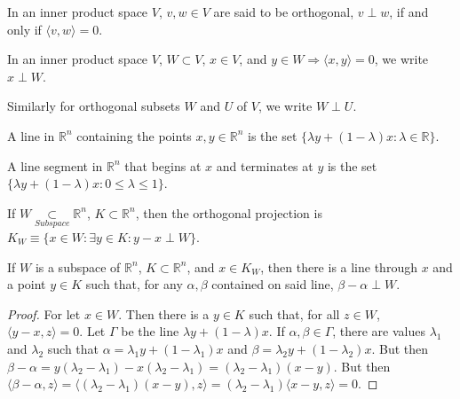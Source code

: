 \documentclass[crop=false,class=book,oneside]{standalone}
\begin{document}
            \begin{definition}
            In an inner product space $V$, $v,w\in V$ are said to be orthogonal, $v\perp w$, if and only if $\langle v,w \rangle = 0$.
            \end{definition}
            \begin{notation}
            In an inner product space $V$, $W\subset V$, $x\in V$, and $y\in W \Rightarrow \langle x,y\rangle = 0$, we write $x\perp W$.
            \end{notation}
            \begin{notation}
            Similarly for orthogonal subsets $W$ and $U$ of $V$, we write $W\perp U$.
            \end{notation}
            \begin{definition}
            A line in $\mathbb{R}^n$ containing the points $x,y\in \mathbb{R}^n$ is the set $\{\lambda y + (1-\lambda)x: \lambda \in \mathbb{R}\}$.
            \end{definition}
            \begin{definition}
            A line segment in $\mathbb{R}^n$ that begins at $x$ and terminates at $y$ is the set $\{\lambda y + (1-\lambda)x: 0\leq \lambda \leq 1 \}$.
            \end{definition}
            \begin{definition}
            If $W\underset{Subspace}\subset\mathbb{R}^n$, $K \subset \mathbb{R}^n$, then the orthogonal projection is $K_{W}\equiv\{x\in W: \exists y\in K: y-x \perp W\}$.
            \end{definition}
            \begin{theorem}
            If $W$ is a subspace of $\mathbb{R}^n$, $K \subset \mathbb{R}^n$, and $x\in K_{W}$, then there is a line through $x$ and a point $y\in K$ such that, for any $\alpha, \beta$ contained on said line, $\beta-\alpha \perp W$.
            \end{theorem}
            \begin{proof}
            For let $x\in W$. Then there is a $y\in K$ such that, for all $z\in W$, $\langle y-x,z\rangle = 0$. Let $\Gamma$ be the line $\lambda y + (1-\lambda)x$. If $\alpha,\beta \in \Gamma$, there are values $\lambda_1$ and $\lambda_2$ such that $\alpha = \lambda_1 y+ (1-\lambda_1)x$ and $\beta = \lambda_2 y +(1-\lambda_2)x$. But then $\beta-\alpha = y(\lambda_2-\lambda_1)-x(\lambda_2-\lambda_1) = (\lambda_2-\lambda_1)(x-y)$. But then $\langle \beta - \alpha,z\rangle = \langle (\lambda_2-\lambda_1)(x-y),z\rangle = (\lambda_2-\lambda_1)\langle x-y,z \rangle = 0$.
            \end{proof}
\end{document}
